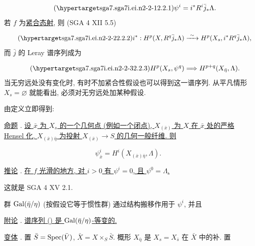 \begin{equation*}\tag{\SGARefTarget{sga7.sga7i.ei.n2-2-1}{2.2.1}}
\psi^i=i^*R^i\bar j_*\Lambda.
\end{equation*}
若 $f$ 为\underline{紧合态射}, 则 (SGA 4 XII 5.5)

\begin{equation*}\tag{\SGARefTarget{sga7.sga7i.ei.n2-2-2}{2.2.2}}
i^*:H^p(X,R^q\bar j_*\Lambda)\xrightarrow{\ \sim\ }
H^p(X_s,i^*R^q\bar j_*\Lambda),
\end{equation*}
而 $\bar j$ 的 Leray 谱序列成为

\begin{equation*}\tag{\SGARefTarget{sga7.sga7i.ei.n2-2-3}{2.2.3}}
H^p(X_s,\psi^q)\Longrightarrow H^{p+q}(X_{\bar\eta},\Lambda).
\end{equation*}
当无穷远处没有变化时, 有时不加紧合性假设也可以得到这一谱序列. 从平凡情形 $X_s=\varnothing$ 就能看出, 必须对无穷远处加某种假设.


由定义立即得到:

\underline{命题} . \underline{设 $\bar x$ 为 $X_s$ 的一个几何点 (例如一个闭点), $X_{(\bar x)}$ 为 $X$ 在 $\bar x$ 处的严格 Hensel 化, $X_{(\bar x)\bar\eta}$ 为投射 $X_{(\bar x)}\longrightarrow S$ 的几何一般纤维. 则}

\begin{equation*}
\psi^i_{\bar x}=H^i(X_{(\bar x)\bar\eta},\Lambda).
\end{equation*}

\underline{推论} . \underline{在 $f$ 光滑的地方, 对 $i>0$ 有 $\psi^i=0$, 且 $\psi^0=\Lambda$.}

这就是 SGA 4 XV 2.1.

群 $\operatorname{Gal}(\bar\eta/\eta)$ (按假设它等于惯性群) 通过结构搬移作用于 $\psi^i$, 并且

\underline{附论} . \underline{谱序列 () 是 $\operatorname{Gal}(\bar\eta/\eta)$-等变的.}

\underline{变体} . 置 $\bar S=\operatorname{Spec}(\bar V)$, $\bar X=X\times_S\bar S$. 概形 $X_{\bar\eta}$ 是 $X_s=X_{\bar s}$ 在 $\bar X$ 中的补. 置


